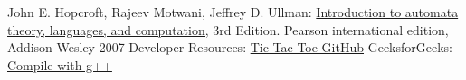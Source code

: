 \documentclass{article}
\theoremstyle{theorem}
\theoremstyle{definition}
\theoremstyle{remark}
\begin{document}
\begin{thebibliography}{99}
	John E. Hopcroft, Rajeev Motwani, Jeffrey D. Ullman:
\href{http://ce.sharif.edu/courses/94-95/1/ce414-2/resources/root/Text%20Books/Automata/John%20E.%20Hopcroft,%20Rajeev%20Motwani,%20Jeffrey%20D.%20Ullman-Introduction%20to%20Automata%20Theory,%20Languages,%20and%20Computations-Prentice%20Hall%20(2006).pdf}{Introduction to automata theory, languages, and computation,} 3rd Edition. Pearson international edition, Addison-Wesley 2007
    Developer Resources:
\href{https://github.com/ssiddique-info/tic-tac-toe-in-c-/}{Tic Tac Toe GitHub}
    GeeksforGeeks:
\href{https://www.geeksforgeeks.org/compiling-with-g-plus-plus/}{Compile with g++}

\end{thebibliography}
\end{document}
